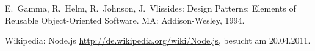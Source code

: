 
\begin{thebibliography}{99}

  E.\ Gamma, R.\ Helm, R.\ Johnson, J.\ Vlissides:
    Design Patterns: Elements of Reusable Object-Oriented Software.
	MA: Addison-Wesley, 1994.


\hspace{-\leftmargin}{\Large\bfseries Web-Referenzen} %

  Wikipedia: Node.js
    \url{http://de.wikipedia.org/wiki/Node.js}, besucht am 20.04.2011.

\end{thebibliography}